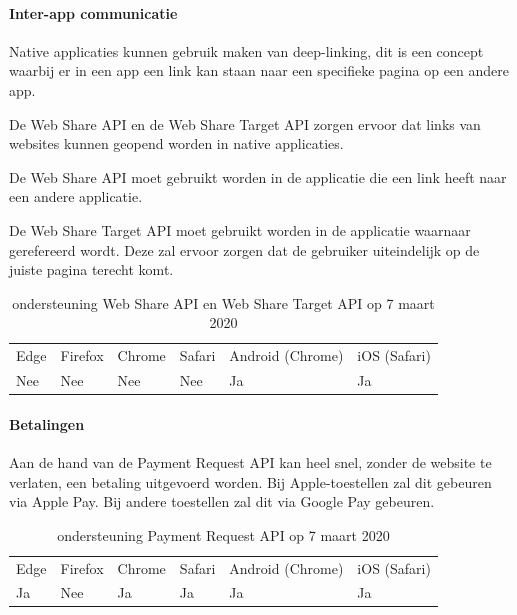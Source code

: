 	
	\paragraph{Inter-app communicatie}
	Native applicaties kunnen gebruik maken van deep-linking, dit is een concept waarbij er in een app een link kan staan naar een specifieke pagina op een andere app.
	
	De Web Share API \autocite{Giuca2019} en de Web Share Target API \autocite{Williger2019} zorgen ervoor dat links van websites kunnen geopend worden in native applicaties. 
	
	De Web Share API moet gebruikt worden in de applicatie die een link heeft naar een andere applicatie.
	
	De Web Share Target API moet gebruikt worden in de applicatie waarnaar gerefereerd wordt. Deze zal ervoor zorgen dat de gebruiker uiteindelijk op de juiste pagina terecht komt.
	
	\begin{table}[H]
		\centering
		\begin{tabular}{llllll}
			Edge & Firefox & Chrome & Safari & Android (Chrome) & iOS (Safari) \\
			Nee   & Nee      &  Nee     & Nee     & Ja               & Ja          
		\end{tabular}	
		\caption{ondersteuning Web Share API en Web Share Target API op 7 maart 2020}
	\end{table}
	
	
	
	\paragraph{Betalingen}
	Aan de hand van de Payment Request API \autocite{Denicola2019} kan heel snel, zonder de website te verlaten, een betaling uitgevoerd worden. Bij Apple-toestellen zal dit gebeuren via Apple Pay. Bij andere toestellen zal dit via Google Pay gebeuren.
	
	\begin{table}[H]
		\centering
		\begin{tabular}{llllll}
			Edge & Firefox & Chrome & Safari & Android (Chrome) & iOS (Safari) \\
			Ja   & Nee      &  Ja     & Ja     & Ja               & Ja          
		\end{tabular}	
		\caption{ondersteuning Payment Request API op 7 maart 2020}
	\end{table}
	
	
